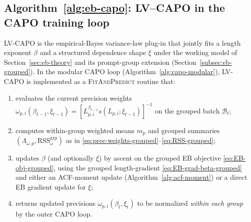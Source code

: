 \begin{algorithm}
\DontPrintSemicolon
\caption{CAPO (modular): GRPO update with a variance-law plug-in}
\label{alg:capo-modular}

\end{algorithm}

\subsection{Algorithm~\ref{alg:eb-capo}: LV--CAPO in the CAPO training loop}
LV-CAPO is the empirical-Bayes variance-law plug-in that jointly fits a length exponent $\beta$ and a structured dependence shape $\xi$ under the working model of Section~\ref{sec:eb-theory} and its prompt-group extension (Section~\ref{subsec:eb-grouped}). In the modular CAPO loop (Algorithm~\ref{alg:capo-modular}), LV-CAPO is implemented as a \textsc{FitAndPredict} routine that:
\begin{enumerate}
  \item evaluates the current precision weights $\omega_{p,i}(\beta_{t-1},\xi_{t-1})=[L_{p,i}^{\beta_{t-1}}s(L_{p,i};\xi_{t-1})]^{-1}$ on the grouped batch $\mathcal B_t$;
  \item computes within-group weighted means $m_p$ and grouped summaries $(\Lambda_{\omega,p},\mathrm{RSS}^{\mathrm{grp}}_{\omega})$ as in \eqref{eq:prec-weights-grouped}--\eqref{eq:RSS-grouped};
  \item updates $\beta$ (and optionally $\xi$) by ascent on the grouped EB objective \eqref{eq:EB-obj-grouped}, using the grouped length-gradient \eqref{eq:EB-grad-beta-grouped} and either an ACF-moment update (Algorithm~\ref{alg:acf-moment}) or a direct EB gradient update for $\xi$;
  \item returns updated precisions $\omega_{p,i}(\beta_t,\xi_t)$ to be normalized \emph{within each group} by the outer CAPO loop.
\end{enumerate}

